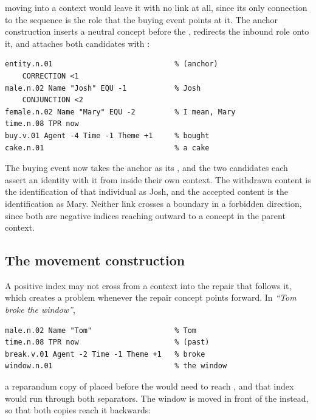 \noindent moving  into a  context would
leave it with no link at all, since its only connection to the sequence is the
 role that the buying event points at it. The anchor construction inserts
a neutral  concept before the ,
redirects the inbound role onto it, and attaches both candidates with
:

\begin{lstlisting}[style=sbn]
entity.n.01                            % (anchor)
    CORRECTION <1
male.n.02 Name "Josh" EQU -1           % Josh
    CONJUNCTION <2
female.n.02 Name "Mary" EQU -2         % I mean, Mary
time.n.08 TPR now
buy.v.01 Agent -4 Time -1 Theme +1     % bought
cake.n.01                              % a cake
\end{lstlisting}

The buying event now takes the anchor as its , and the two
candidates each assert an identity with it from inside their own context. The
withdrawn content is the identification of that individual as Josh, and the
accepted content is the identification as Mary. Neither  link
crosses a boundary in a forbidden direction, since both are negative indices
reaching outward to a concept in the parent context.

\subsection{The movement construction}
\label{app:devices-movement}

A positive index may not cross from a  context into the
repair that follows it, which creates a problem whenever the repair concept
points forward. In \textit{``Tom broke the window''},

\begin{lstlisting}[style=sbn]
male.n.02 Name "Tom"                   % Tom
time.n.08 TPR now                      % (past)
break.v.01 Agent -2 Time -1 Theme +1   % broke
window.n.01                            % the window
\end{lstlisting}

\noindent a reparandum copy of  placed before the
 would need  to reach
, and that index would run through both separators. The
window is moved in front of the  instead, so that both
copies reach it backwards:

